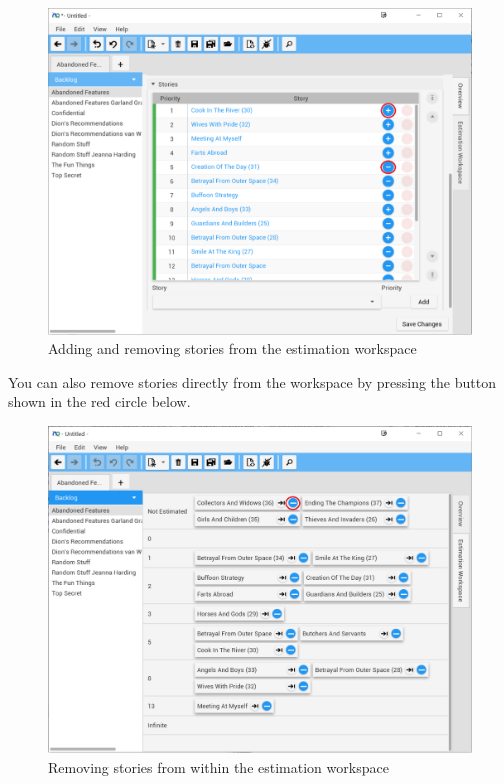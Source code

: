 \begin{figure}[H]
\centering
\includegraphics[width=\textwidth]{images/screenshots/estimationWorkspace2.PNG}
\caption{Adding and removing stories from the estimation workspace}
\label{fig:new_project}
\end{figure}

\pagebreak
You can also remove stories directly from the workspace by pressing the button shown in the red circle below.

\begin{figure}[H]
\centering
\includegraphics[width=\textwidth]{images/screenshots/estimationWorkspace3.PNG}
\caption{Removing stories from within the estimation workspace}
\label{fig:new_project}
\end{figure}

